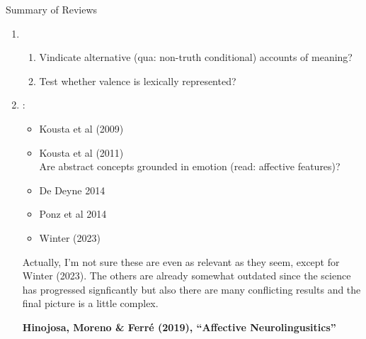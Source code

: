 \documentclass[12pt,letterpaper,table,svgnames,dvipsnames]{article}
\begin{document}
\noindent Summary of Reviews
\begin{enumerate}
    \item {}\\
    
 



        \begin{enumerate}
            \item Vindicate alternative (qua: non-truth conditional) accounts of meaning?

            \item Test whether valence is lexically represented?
        \end{enumerate}


    \item {}:

        \begin{itemize}
            \item Kousta et al (2009)
            \item Kousta et al (2011)\\
            Are abstract concepts grounded in emotion (read: affective features)?
            \item De Deyne 2014
            \item Ponz et al 2014
            \item Winter (2023)
        \end{itemize}

        Actually, I'm not sure these are even as relevant as they seem, except for Winter (2023). The others are already somewhat outdated since the science has progressed signficantly but also there are many conflicting results and the final picture is a little complex.

        \textbf{Hinojosa, Moreno \& Ferré (2019), ``Affective Neurolingusitics''}



\end{enumerate}
\end{document}
